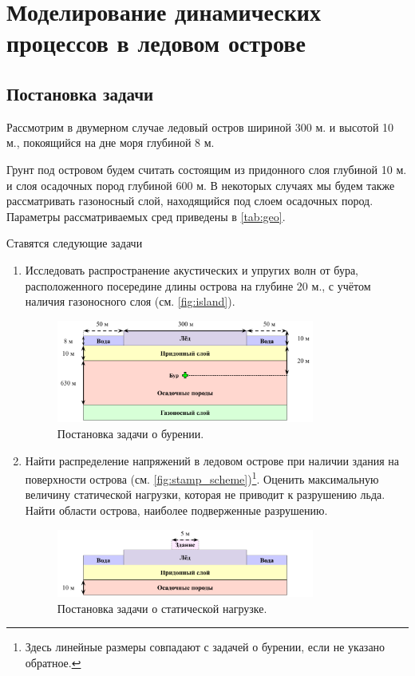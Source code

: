 \section{Моделирование динамических процессов в ледовом острове}

\subsection{Постановка задачи}

Рассмотрим в двумерном случае ледовый остров шириной 300 м. и высотой 10 м., покоящийся на дне моря глубиной 8 м.

Грунт под островом будем считать состоящим из придонного слоя глубиной 10 м. и слоя осадочных пород глубиной 600 м. В некоторых случаях мы будем также рассматривать  газоносный слой, находящийся под слоем осадочных пород. Параметры рассматриваемых сред приведены в \autoref{tab:geo}.

Ставятся следующие задачи

\begin{enumerate}
    \item Исследовать распространение акустических и упругих волн от бура, расположенного посередине длины острова на глубине 20 м., с учётом наличия газоносного слоя (см. \autoref{fig:island}).
    
    \begin{figure}[htb]
        \centering
        \includegraphics[width=0.8\textwidth]{images/gas_field/gas_field_scheme.png}
        \caption{Постановка задачи о бурении.}
        \label{fig:island}
    \end{figure}

    \item Найти распределение напряжений в ледовом острове при наличии здания на поверхности острова (см. \autoref{fig:stamp_scheme})\footnote{Здесь линейные размеры совпадают с задачей о бурении, если не указано обратное.}. Оценить максимальную величину статической нагрузки, которая не приводит к разрушению льда. Найти области острова, наиболее подверженные разрушению.
    
    \begin{figure}[htb]
        \centering
        \includegraphics[width=0.8\textwidth]{images/stamp/stamp_scheme.png}
        \caption{Постановка задачи о статической нагрузке.}
        \label{fig:stamp_scheme}
    \end{figure}
\end{enumerate}

